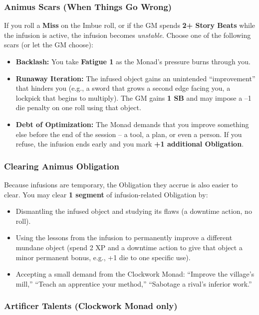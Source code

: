 \subsubsection*{Animus Scars (When Things Go Wrong)}
If you roll a \textbf{Miss} on the Imbue roll, or if the GM spends \textbf{2+ Story Beats} while the infusion is active, the infusion becomes \textit{unstable}. Choose one of the following scars (or let the GM choose):
\begin{itemize}
  \item \textbf{Backlash:} You take \textbf{Fatigue 1} as the Monad's pressure burns through you.
  \item \textbf{Runaway Iteration:} The infused object gains an unintended ``improvement'' that hinders you (e.g., a sword that grows a second edge facing you, a lockpick that begins to multiply). The GM gains \textbf{1 SB} and may impose a --1 die penalty on one roll using that object.
  \item \textbf{Debt of Optimization:} The Monad demands that you improve something else before the end of the session -- a tool, a plan, or even a person. If you refuse, the infusion ends early and you mark \textbf{+1 additional Obligation}.
\end{itemize}

\subsubsection*{Clearing Animus Obligation}
Because infusions are temporary, the Obligation they accrue is also easier to clear. You may clear \textbf{1 segment} of infusion-related Obligation by:
\begin{itemize}
  \item Dismantling the infused object and studying its flaws (a downtime action, no roll).
  \item Using the lessons from the infusion to permanently improve a different mundane object (spend 2 XP and a downtime action to give that object a minor permanent bonus, e.g., +1 die to one specific use).
  \item Accepting a small demand from the Clockwork Monad: ``Improve the village's mill,'' ``Teach an apprentice your method,'' ``Sabotage a rival's inferior work.''
\end{itemize}

\subsubsection*{Artificer Talents (Clockwork Monad only)}

